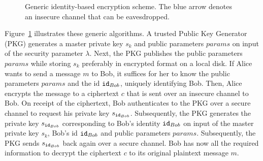 \begin{figure}[ht]
\begin{center}
{
    }
    \end{center}
    \caption{Generic identity-based encryption scheme. The blue arrow denotes an insecure channel that can be eavesdropped.}
    \label{fig:generic_ibe_scheme}
\end{figure}

Figure~\ref{fig:generic_ibe_scheme} illustrates these generic algorithms. A trusted Public Key Generator (PKG) generates a master private key $s_k$ and public parameters $params$ on input of the security parameter $\lambda$. Next, the PKG publishes the public parameters $params$ while storing $s_k$ preferably in encrypted format on a local disk. If Alice wants to send a message $m$ to Bob, it suffices for her to know the public parameters $params$ and the id $\mathtt{id}_{Bob}$, uniquely identifying Bob. Then, Alice encrypts the message to a ciphertext $c$ that is sent over an insecure channel to Bob. On receipt of the ciphertext, Bob authenticates to the PKG over a secure channel to request his private key $s_{\mathtt{id}_{Bob}}$. Subsequently, the PKG generates the private key $s_{\mathtt{id}_{Bob}}$ corresponding to Bob's identity $\mathtt{id}_{Bob}$ on input of the master private key $s_k$, Bob's id $\mathtt{id}_{Bob}$ and public parameters $params$. Subsequently, the PKG sends $s_{\mathtt{id}_{Bob}}$ back again over a secure channel. Bob has now all the required information to decrypt the ciphertext $c$ to its original plaintext message $m$.


